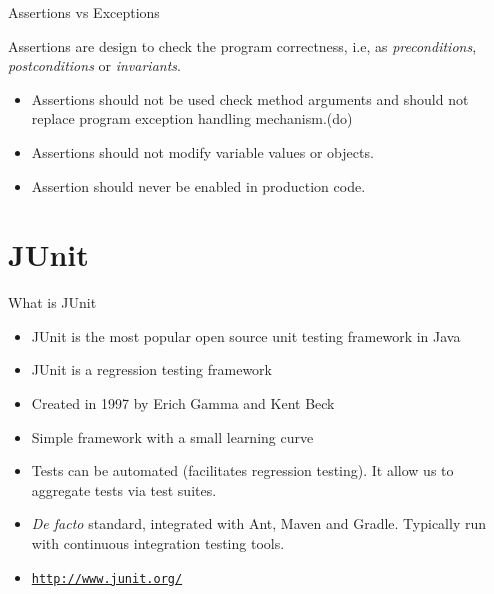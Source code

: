 \documentclass[11pt, xcolor=svgnames]{beamer}
\begin{document}

\begin{frame}[fragile]{Assertions vs Exceptions}

Assertions are design to check the program correctness, i.e, as \emph{preconditions}, \emph{postconditions} or \emph{invariants}.

\begin{itemize}
 \item Assertions should not be used check method arguments and should not replace program exception handling mechanism.\newline (do)
 \item Assertions should not modify variable values or objects.
 \item Assertion should never be enabled in production code.
\end{itemize}


\end{frame}



\section{JUnit}


\begin{frame}{What is JUnit}

  \begin{itemize}
     \item JUnit is the most popular open source unit testing framework in Java
     \item JUnit is a regression testing framework
     \item Created in 1997 by Erich Gamma and Kent Beck
     \item Simple framework with a small learning curve
     \item Tests can be automated (facilitates regression testing). It allow us to aggregate tests via test suites.
     \item \textit{De facto} standard, integrated with Ant, Maven and Gradle. Typically run with continuous integration testing tools. 
     \item \texttt{\url{http://www.junit.org/}}
  \end{itemize}
\end{frame}
\end{document}
